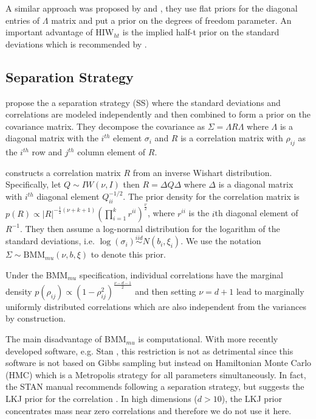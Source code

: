 \documentclass[12pt]{article}
\begin{document}
A similar approach was proposed by \cite{daniels1999} and \cite{matilde}, they use flat priors for the diagonal entries of $\Lambda$ matrix and put a prior on the degrees of freedom parameter.  An important advantage of  HIW$_{ht}$ is the implied half-t prior on the standard deviations which is recommended by \cite{gelman2006prior}.

\subsection{Separation Strategy \label{sec:ss} }

\cite{barnard2000} propose the a separation strategy (SS) where the standard deviations and correlations are modeled independently and then combined to form a prior on the covariance matrix. They decompose the covariance as $\Sigma = \Lambda R \Lambda$  where $\Lambda$ is a diagonal matrix with the $i^{th}$ element $\sigma_{i}$ and $R$ is a correlation matrix with $\rho_{ij}$ as the $i^{th}$ row and $j^{th}$ column element of $R$. 

\cite{barnard2000} constructs a correlation matrix $R$ from an inverse Wishart distribution. Specifically, let $Q\sim IW(\nu, I )$ then $R = \Delta Q \Delta$ where $\Delta$ is a diagonal matrix with $i^{th}$ diagonal element $Q_{ii}^{-1/2}$. The prior density for the correlation matrix is $p(R) \propto |R|^{-\frac{1}{2}(\nu+k+1) }  (\prod_{i=1}^k r^{ii}) ^{\frac{\nu}{2}}$, where $r^{ii}$ is the $i$th diagonal element of $R^{-1}$. They then assume a log-normal distribution for the logarithm of the standard deviations, i.e. $\log(\sigma_i) \stackrel{iid} \sim N(b_i, \xi_i)$.  We use the notation $\Sigma \sim \mbox{BMM}_{mu}(\nu,b,\xi)$ to denote this prior.

Under the BMM$_{mu}$ specification, individual correlations have the marginal density $p(\rho_{ij}) \propto (1-\rho_{ij}^2)^{\frac{\nu-d-1}{2}}$ and then setting $\nu=d+1$ lead to marginally uniformly distributed correlations which are also independent from the variances by construction. 

The main disadvantage of BMM$_{mu}$ is computational. %
With more recently developed software, e.g. Stan \citep{stan2014}, this restriction is not as  detrimental since this software is not based on Gibbs sampling but instead on Hamiltonian Monte Carlo (HMC) which is a Metropolis strategy for all parameters simultaneously.  In fact, the STAN manual \citep{stanmanual2014} recommends following a separation strategy, but suggests the LKJ prior for the correlation \cite{lewandowski2009generating}. In high dimensions ($d>10$), the LKJ prior concentrates mass near zero correlations and therefore we do not use it here.
\end{document}
